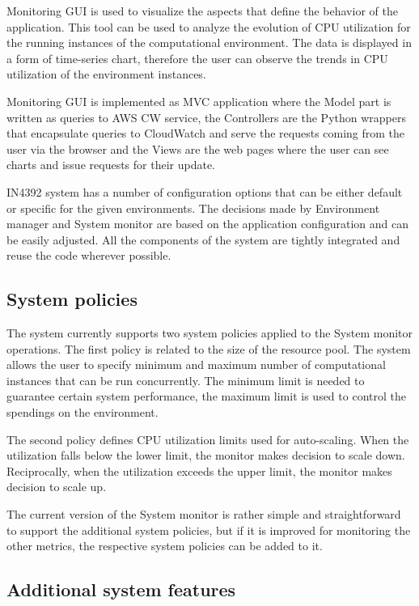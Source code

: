 \documentclass[conference]{IEEEtran}
\begin{document}
Monitoring GUI is used to visualize the aspects that define the behavior of the application. This tool can be used to analyze the evolution of CPU utilization for the running instances of the computational environment. The data is displayed in a form of time-series chart, therefore the user can observe the trends in CPU utilization of the environment instances. 

Monitoring GUI is implemented as MVC application where the Model part is written as queries to AWS CW service, the Controllers are the Python wrappers that encapsulate queries to CloudWatch and serve the requests coming from the user via the browser and the Views are the web pages 
where the user can see charts and issue requests for their update. 

IN4392 system has a number of configuration options that can be either default or specific for the given environments. The decisions made by Environment manager and System monitor are based on the application configuration and can be easily adjusted. All the components of the system are tightly integrated and reuse the code wherever possible. 

\subsection{System policies}

The system currently supports two system policies applied to the System monitor operations. The first policy is related to the size of the resource pool. The system allows the user to specify minimum and maximum number of computational instances that can be run concurrently. The minimum limit is needed to guarantee certain system performance, the maximum limit is used to control the spendings on the environment.

The second policy defines CPU utilization limits used for auto-scaling. When the utilization falls below the lower limit, the monitor makes decision to scale down. Reciprocally, when the utilization exceeds the upper limit, the monitor makes decision to scale up. 

The current version of the System monitor is rather simple and straightforward to support the additional system policies, but if it is improved for monitoring the other metrics, the respective system policies can be added to it.

\subsection{Additional system features}
\end{document}
